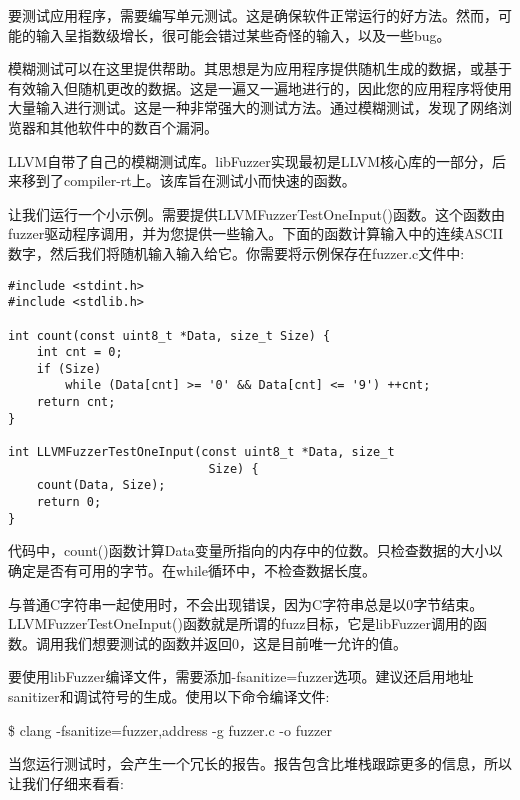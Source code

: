 
要测试应用程序，需要编写单元测试。这是确保软件正常运行的好方法。然而，可能的输入呈指数级增长，很可能会错过某些奇怪的输入，以及一些bug。\par

模糊测试可以在这里提供帮助。其思想是为应用程序提供随机生成的数据，或基于有效输入但随机更改的数据。这是一遍又一遍地进行的，因此您的应用程序将使用大量输入进行测试。这是一种非常强大的测试方法。通过模糊测试，发现了网络浏览器和其他软件中的数百个漏洞。\par

LLVM自带了自己的模糊测试库。libFuzzer实现最初是LLVM核心库的一部分，后来移到了compiler-rt上。该库旨在测试小而快速的函数。\par

让我们运行一个小示例。需要提供LLVMFuzzerTestOneInput()函数。这个函数由fuzzer驱动程序调用，并为您提供一些输入。下面的函数计算输入中的连续ASCII数字，然后我们将随机输入输入给它。你需要将示例保存在fuzzer.c文件中:\par

\begin{lstlisting}[caption={}]
#include <stdint.h>
#include <stdlib.h>

int count(const uint8_t *Data, size_t Size) {
	int cnt = 0;
	if (Size)
		while (Data[cnt] >= '0' && Data[cnt] <= '9') ++cnt;
	return cnt;
}

int LLVMFuzzerTestOneInput(const uint8_t *Data, size_t
							Size) {
	count(Data, Size);
	return 0;
}
\end{lstlisting}

代码中，count()函数计算Data变量所指向的内存中的位数。只检查数据的大小以确定是否有可用的字节。在while循环中，不检查数据长度。\par

与普通C字符串一起使用时，不会出现错误，因为C字符串总是以0字节结束。LLVMFuzzerTest\allowbreak OneInput()函数就是所谓的fuzz目标，它是libFuzzer调用的函数。调用我们想要测试的函数并返回0，这是目前唯一允许的值。\par

要使用libFuzzer编译文件，需要添加-fsanitize=fuzzer选项。建议还启用地址sanitizer和调试符号的生成。使用以下命令编译文件:\par

\begin{tcolorbox}[colback=white,colframe=black]
\$ clang -fsanitize=fuzzer,address -g fuzzer.c -o fuzzer
\end{tcolorbox}

当您运行测试时，会产生一个冗长的报告。报告包含比堆栈跟踪更多的信息，所以让我们仔细来看看:\par

